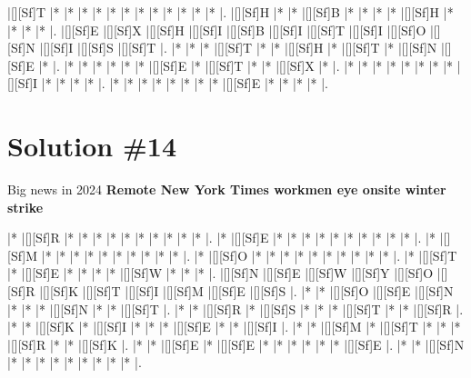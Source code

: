 \documentclass[letterpaper]{article}
\begin{document}
\vspace*{1em}
\begin{Puzzle}{13}{7}
|[][Sf]T  |*        |*        |*        |*        |*        |*        |*        |*        |*        |*        |*        |*        |.
|[][Sf]H  |*        |*        |[][Sf]B  |*        |*        |*        |*        |[][Sf]H  |*        |*        |*        |*        |.
|[][Sf]E  |[][Sf]X  |[][Sf]H  |[][Sf]I  |[][Sf]B  |[][Sf]I  |[][Sf]T  |[][Sf]I  |[][Sf]O  |[][Sf]N  |[][Sf]I  |[][Sf]S  |[][Sf]T  |.
|*        |*        |*        |[][Sf]T  |*        |*        |[][Sf]H  |*        |[][Sf]T  |*        |[][Sf]N  |[][Sf]E  |*        |.
|*        |*        |*        |*        |*        |*        |[][Sf]E  |*        |[][Sf]T  |*        |*        |[][Sf]X  |*        |.
|*        |*        |*        |*        |*        |*        |*        |*        |[][Sf]I  |*        |*        |*        |*        |.
|*        |*        |*        |*        |*        |*        |*        |*        |[][Sf]E  |*        |*        |*        |*        |.
\end{Puzzle}

\newpage
\section*{Solution \#14}
Big news in 2024
\newline\textbf{Remote New York Times workmen eye onsite winter strike}

\vspace*{1em}
\begin{Puzzle}{12}{13}
|*        |[][Sf]R  |*        |*        |*        |*        |*        |*        |*        |*        |*        |*        |.
|*        |[][Sf]E  |*        |*        |*        |*        |*        |*        |*        |*        |*        |*        |.
|*        |[][Sf]M  |*        |*        |*        |*        |*        |*        |*        |*        |*        |*        |.
|*        |[][Sf]O  |*        |*        |*        |*        |*        |*        |*        |*        |*        |*        |.
|*        |[][Sf]T  |*        |[][Sf]E  |*        |*        |*        |*        |[][Sf]W  |*        |*        |*        |.
|[][Sf]N  |[][Sf]E  |[][Sf]W  |[][Sf]Y  |[][Sf]O  |[][Sf]R  |[][Sf]K  |[][Sf]T  |[][Sf]I  |[][Sf]M  |[][Sf]E  |[][Sf]S  |.
|*        |*        |[][Sf]O  |[][Sf]E  |[][Sf]N  |*        |*        |*        |[][Sf]N  |*        |*        |[][Sf]T  |.
|*        |*        |[][Sf]R  |*        |[][Sf]S  |*        |*        |*        |[][Sf]T  |*        |*        |[][Sf]R  |.
|*        |*        |[][Sf]K  |*        |[][Sf]I  |*        |*        |*        |[][Sf]E  |*        |*        |[][Sf]I  |.
|*        |*        |[][Sf]M  |*        |[][Sf]T  |*        |*        |*        |[][Sf]R  |*        |*        |[][Sf]K  |.
|*        |*        |[][Sf]E  |*        |[][Sf]E  |*        |*        |*        |*        |*        |*        |[][Sf]E  |.
|*        |*        |[][Sf]N  |*        |*        |*        |*        |*        |*        |*        |*        |*        |.
\end{Puzzle}
\end{document}
